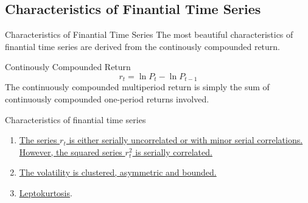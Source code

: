 \documentclass{beamer}
\begin{document}
\subsection{Characteristics of Finantial Time Series}
\begin{frame}{Characteristics of Finantial Time Series}
  The most beautiful characteristics of finantial time series are derived from the continously compounded return.
  \begin{block}{Continously Compounded Return}
    \begin{displaymath}
      r_{t} = \ln P_{t} - \ln P_{t-1}
    \end{displaymath}
    The continuously compounded multiperiod return is simply the sum of continuously compounded one-period returns involved.
  \end{block}
  
  \begin{block}{Characteristics of finantial time series}
    \begin{enumerate}
      \item \hyperlink{series corr}{The series ${r_{t}}$ is either serially uncorrelated or with minor serial correlations. However, the squared series ${r_{t}^2}$ is serially correlated.}
      \item \hyperlink{volatility clustered}{The volatility is clustered, asymmetric and bounded.}
      \item \hyperlink{Leptokurtosis}{Leptokurtosis}.
    \end{enumerate}
  \end{block}
\end{frame}


\end{document}
